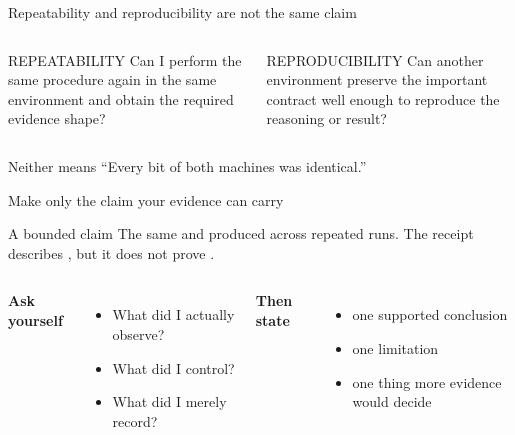\documentclass[aspectratio=169,11pt]{beamer}
\begin{document}
\begin{frame}{Repeatability and reproducibility are not the same claim}
\begin{columns}[T,onlytextwidth]
\begin{block}{REPEATABILITY}
Can I perform the same procedure again in the same environment and obtain the required evidence shape?
\end{block}

\begin{exampleblock}{REPRODUCIBILITY}
Can another environment preserve the important contract well enough to reproduce the reasoning or result?
\end{exampleblock}
\end{columns}

\vspace{0.35cm}
\begin{alertblock}{Neither means}
``Every bit of both machines was identical.''
\end{alertblock}
\end{frame}

\begin{frame}{Make only the claim your evidence can carry}
\begin{block}{A bounded claim}
The same \underline{\hspace{2.0cm}} and \underline{\hspace{2.0cm}} produced \underline{\hspace{2.5cm}} across repeated runs. The receipt describes \underline{\hspace{2.7cm}}, but it does not prove \underline{\hspace{2.7cm}}.
\end{block}

\vspace{0.45cm}
\begin{columns}[T,onlytextwidth]
\textbf{Ask yourself}
\begin{itemize}
  \item What did I actually observe?
  \item What did I control?
  \item What did I merely record?
\end{itemize}

\textbf{Then state}
\begin{itemize}
  \item one supported conclusion
  \item one limitation
  \item one thing more evidence would decide
\end{itemize}
\end{columns}
\end{frame}
\end{document}
